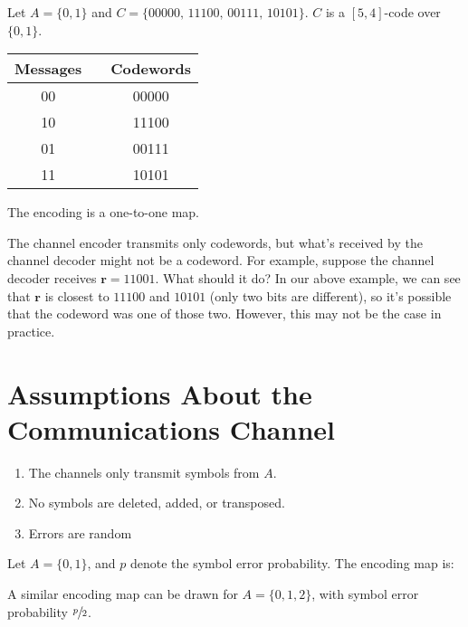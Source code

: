 \begin{exbox}
    \begin{example}
        Let $ A=\{0,1\} $ and $ C=\{00000,\,11100,\,00111,\,10101\} $.
        $ C $ is a $ [5,4] $-code over $ \{0,1\} $.
        \begin{table}[H]
            \centering
            \begin{tabular}{@{}ccc@{}}
                Messages & \textrightarrow{} & Codewords \\
                \midrule
                00       & \textrightarrow{} & 00000     \\
                10       & \textrightarrow{} & 11100     \\
                01       & \textrightarrow{} & 00111     \\
                11       & \textrightarrow{} & 10101     \\
            \end{tabular}
        \end{table}
        The encoding is a one-to-one map.
    \end{example}
\end{exbox}

The channel encoder transmits only codewords, but what's received by the channel
decoder might not be a codeword. For example, suppose the channel decoder
receives $ \bm{r}=11001 $. What should it do? In our above example, we can see
that $ \bm{r} $ is closest to $ 11100 $ and $ 10101 $ (only two bits are different),
so it's possible that the codeword was one of those two. However,
this may not be the case in practice.

\section{Assumptions About the Communications Channel}
\begin{enumerate}[label=(\arabic*)]
    \item The channels only transmit symbols from $ A $.
    \item No symbols are deleted, added, or transposed.
    \item Errors are random
\end{enumerate}

\begin{exbox}
    \begin{example}
        Let $ A=\{0,1\} $, and $ p $ denote the symbol error probability.
        The encoding map is:
        \begin{center}
            
        \end{center}
    \end{example}
    A similar encoding map can be drawn for $ A=\{0,1,2\} $,
    with symbol error probability $ \sfrac{p}{2} $.
\end{exbox}

